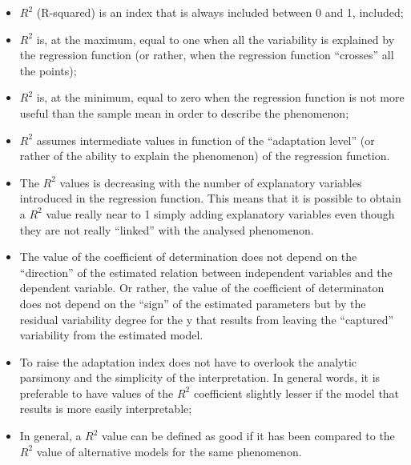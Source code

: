 \begin{frame}
  \vspace*{.25cm}
  \begin{small}
    \begin{itemize}
      \item $ R^{2} $ (R-squared) is an index that is always included between 0 and 1, included;
      \item $ R^{2} $ is, at the maximum, equal to one when all the variability is explained by the regression function (or rather, when the regression function ``crosses'' all the points);
      \item $ R^{2} $ is, at the minimum, equal to zero when the regression function is not more useful than the sample mean in order to describe the phenomenon;
      \item $ R^{2} $ assumes intermediate values in function of the ``adaptation level'' (or rather of the ability to explain the phenomenon) of the regression function.
      \item The $ R^{2} $  values is decreasing with the number of explanatory variables introduced in the regression function. This means that it is possible to obtain a $R^{2}$ value really near to 1 simply adding explanatory variables even though they are not really ``linked'' with the analysed phenomenon.
    \end{itemize}
  \end{small}
\end{frame}

\begin{frame}
  \begin{itemize}
    \item The value of the coefficient of determination does not depend on the ``direction'' of the estimated relation between independent variables and the dependent variable. Or rather, the value of the coefficient of determinaton does not depend on the ``sign'' of the estimated parameters but by the residual variability degree for the y that results from leaving the ``captured'' variability from the estimated model.
    \item To raise the adaptation index does not have to overlook the analytic parsimony and the simplicity of the interpretation. In general words, it is preferable to have values of the $R^{2}$ coefficient slightly lesser if the model that results is more easily interpretable;
    \item In general, a $ R^{2} $ value can be defined as good if it has been compared to the $ R^{2} $ value of alternative models for the same phenomenon.
  \end{itemize}
\end{frame}

